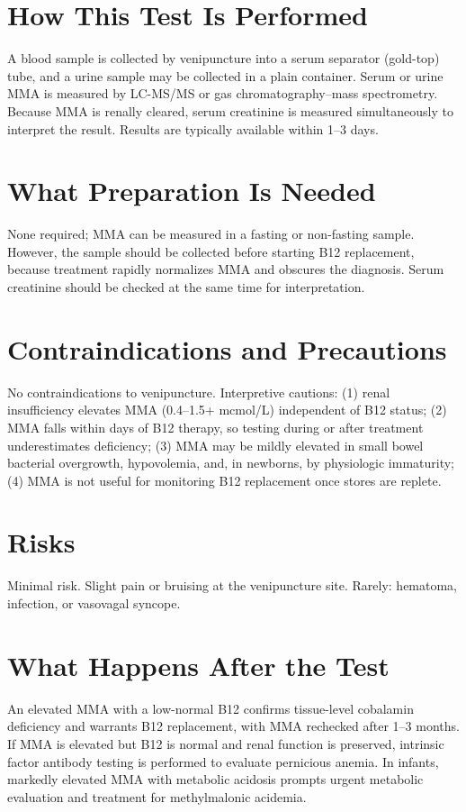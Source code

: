 \section*{How This Test Is Performed}
A blood sample is collected by venipuncture into a serum separator (gold-top) tube, and a urine sample may be collected in a plain container. Serum or urine MMA is measured by LC-MS/MS or gas chromatography--mass spectrometry. Because MMA is renally cleared, serum creatinine is measured simultaneously to interpret the result. Results are typically available within 1--3 days.
\section*{What Preparation Is Needed}
None required; MMA can be measured in a fasting or non-fasting sample. However, the sample should be collected before starting B12 replacement, because treatment rapidly normalizes MMA and obscures the diagnosis. Serum creatinine should be checked at the same time for interpretation.
\section*{Contraindications and Precautions}
No contraindications to venipuncture. Interpretive cautions: (1) renal insufficiency elevates MMA (0.4--1.5+ mcmol/L) independent of B12 status; (2) MMA falls within days of B12 therapy, so testing during or after treatment underestimates deficiency; (3) MMA may be mildly elevated in small bowel bacterial overgrowth, hypovolemia, and, in newborns, by physiologic immaturity; (4) MMA is not useful for monitoring B12 replacement once stores are replete.
\section*{Risks}
Minimal risk. Slight pain or bruising at the venipuncture site. Rarely: hematoma, infection, or vasovagal syncope.
\section*{What Happens After the Test}
An elevated MMA with a low-normal B12 confirms tissue-level cobalamin deficiency and warrants B12 replacement, with MMA rechecked after 1--3 months. If MMA is elevated but B12 is normal and renal function is preserved, intrinsic factor antibody testing is performed to evaluate pernicious anemia. In infants, markedly elevated MMA with metabolic acidosis prompts urgent metabolic evaluation and treatment for methylmalonic acidemia.
